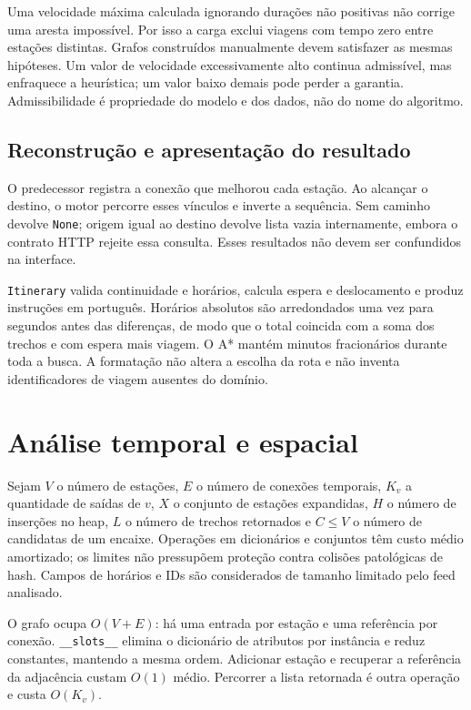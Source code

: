 \documentclass[12pt]{article}
\newcommand{\code}[1]{\texttt{#1}}
\begin{document}
Uma velocidade máxima calculada ignorando durações não positivas não corrige uma aresta impossível. Por isso a carga exclui viagens com tempo zero entre estações distintas. Grafos construídos manualmente devem satisfazer as mesmas hipóteses. Um valor de velocidade excessivamente alto continua admissível, mas enfraquece a heurística; um valor baixo demais pode perder a garantia. Admissibilidade é propriedade do modelo e dos dados, não do nome do algoritmo.

\subsection{Reconstrução e apresentação do resultado}
O predecessor registra a conexão que melhorou cada estação. Ao alcançar o destino, o motor percorre esses vínculos e inverte a sequência. Sem caminho devolve \code{None}; origem igual ao destino devolve lista vazia internamente, embora o contrato HTTP rejeite essa consulta. Esses resultados não devem ser confundidos na interface.

\code{Itinerary} valida continuidade e horários, calcula espera e deslocamento e produz instruções em português. Horários absolutos são arredondados uma vez para segundos antes das diferenças, de modo que o total coincida com a soma dos trechos e com espera mais viagem. O A* mantém minutos fracionários durante toda a busca. A formatação não altera a escolha da rota e não inventa identificadores de viagem ausentes do domínio.

\section{Análise temporal e espacial}
Sejam $V$ o número de estações, $E$ o número de conexões temporais, $K_v$ a quantidade de saídas de $v$, $X$ o conjunto de estações expandidas, $H$ o número de inserções no heap, $L$ o número de trechos retornados e $C\leq V$ o número de candidatas de um encaixe. Operações em dicionários e conjuntos têm custo médio amortizado; os limites não pressupõem proteção contra colisões patológicas de hash. Campos de horários e IDs são considerados de tamanho limitado pelo feed analisado.

O grafo ocupa $O(V+E)$: há uma entrada por estação e uma referência por conexão. \code{\_\_slots\_\_} elimina o dicionário de atributos por instância e reduz constantes, mantendo a mesma ordem. Adicionar estação e recuperar a referência da adjacência custam $O(1)$ médio. Percorrer a lista retornada é outra operação e custa $O(K_v)$.
\end{document}
